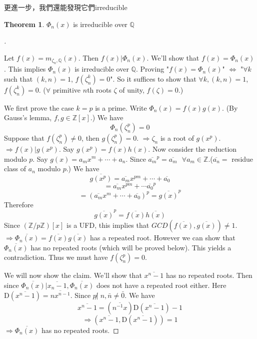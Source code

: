 \documentclass{article}
\newcommand{\sfa}{\text{  } \forall}
\theoremstyle{definition}
\newtheorem{thm}{Theorem}
\newenvironment{proofs}[1][\proofname]{%
  \begin{proof}[#1]$ $\par\nobreak\ignorespaces
}{%
  \end{proof}
}
\begin{document}
更進一步，我們還能發現它們irreducible

\begin{thm}
	$\Phi_n(x)$ is irreducible over $\mathbb{Q}$
\end{thm}

\begin{proofs}
	Let $f(x) = m_{\zeta_n, \mathbb{Q}}(x)$.
	Then $f(x) | \Phi_n(x)$.
	We'll show that $f(x) = \Phi_n(x)$.
	This implies $\Phi_n(x)$ is irreducible over $\mathbb{Q}$.
	Proving "$f(x) = \Phi_n(x)$" $\Leftrightarrow$ "$\forall k$ such that $(k, n) = 1$, $f(\zeta_n^k) = 0$".
	So it suffices to show that $\forall k, (k, n) = 1$, $f(\zeta_n^k) = 0$. ($\forall $ primitive $n$th roots $\zeta$ of unity, $f(\zeta) = 0$.)
	\par We first prove the case $k = p$ is a prime.
	Write $\Phi_n(x) = f(x) g(x)$. (By Gauss's lemma, $f, g \in \mathbb{Z}[x]$.)
	We have
	\[
		\Phi_n(\zeta_n^p) = 0
	\]
	Suppose that $f(\zeta_n^p) \neq 0$, then $g(\zeta_n^p) = 0$.
	$\Rightarrow \zeta_n$ is a root of $g(x^p)$.
	$\Rightarrow f(x) | g(x^p)$.
	Say $g(x^p) = f(x) h(x)$.
	Now consider the reduction modulo $p$.
	Say $g(x) = a_m x^m + \cdots + a_n$.
	Since $\overline{a_m}^p = \overline{a_m} \sfa a_m \in \mathbb{Z}$.($\overline{a_n} = $ residue class of $a_n$ modulo $p$.)
	We have
	\[
		\overline{g(x^p)} = \overline{a_m} x^{pm} + \cdots + \overline{a_0}
	\]
	\[
		= \overline{a_m} x^{pm} + \cdots \overline{a_0}^p
	\]
	\[
		= (\overline{a_m} x^m + \cdots + \overline{a_0})^p = \overline{g(x)}^p
	\]
	Therefore
	\[
		\overline{g(x)}^p = \overline{f(x)}\overline{h(x)}
	\]
	Since $(\mathbb{Z}/p \mathbb{Z})[x]$ is a UFD, this implies that $GCD(\overline{f(x)}, \overline{g(x)}) \neq 1$.
	$\Rightarrow \overline{\Phi_n(x)} = \overline{f(x)} \overline{g(x)}$ has a repeated root.
	However we can show that $\overline{\Phi_n(x)}$ has no repeated roots (which will be proved below).
	This yields a contradiction.
	Thus we must have $f(\zeta_n^p) = 0$.
	\par We will now show the claim.
	We'll show that $\overline{x^n - 1}$ has no repeated roots.
	Then since $\overline{\Phi_n(x)} | \overline{x_n - 1}, \overline{\Phi_n(x)}$ does not have a repeated root either.
	Here $\mathrm{D}(\overline{x^n - 1}) = \overline{n x^{n - 1}}$.
	Since $p \not| \; n, \bar{n} \neq \bar{0}$.
	We have
	\[
		\overline{x^n - 1} = (\overline{n^{-1}x}) \mathrm{D}(\overline{x^n - 1}) - 1
	\]
	\[
		\Rightarrow (\overline{x^n - 1}, \mathrm{D}(\overline{x^n - 1})) = 1
	\]
	$\Rightarrow \overline{\Phi_n(x)}$ has no repeated roots.
\end{proofs}
\end{document}
